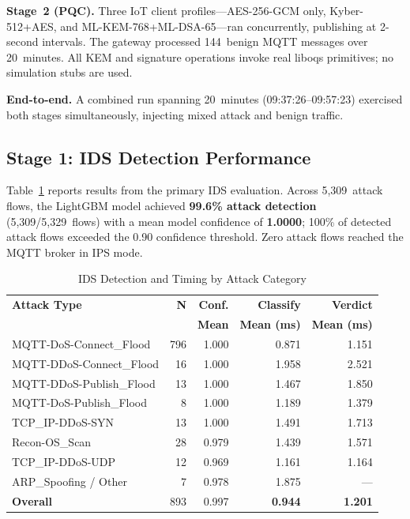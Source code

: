 \documentclass[conference]{IEEEtran}
\begin{document}
\textbf{Stage~2 (PQC).} Three IoT client profiles---AES-256-GCM only, Kyber-512+AES, and ML-KEM-768+ML-DSA-65---ran concurrently, publishing at 2-second intervals. The gateway processed 144~benign MQTT messages over 20~minutes. All KEM and signature operations invoke real liboqs primitives; no simulation stubs are used.

\textbf{End-to-end.} A combined run spanning 20~minutes (09:37:26--09:57:23) exercised both stages simultaneously, injecting mixed attack and benign traffic.

\subsection{Stage 1: IDS Detection Performance}

Table~\ref{tab:ids} reports results from the primary IDS evaluation. Across 5,309~attack flows, the LightGBM model achieved \textbf{99.6\% attack detection} (5,309/5,329~flows) with a mean model confidence of \textbf{1.0000}; 100\% of detected attack flows exceeded the 0.90 confidence threshold. Zero attack flows reached the MQTT broker in IPS mode.

\begin{table}[!t]
\centering
\captionsetup{font=footnotesize, skip=2pt}
\caption{IDS Detection and Timing by Attack Category}
\label{tab:ids}
\footnotesize
\setlength{\tabcolsep}{3pt}
\begin{tabular}{lrrrr}
\toprule
\textbf{Attack Type} & \textbf{N} & \textbf{Conf.} & \textbf{Classify} & \textbf{Verdict} \\
                     &            & \textbf{Mean}  & \textbf{Mean (ms)}& \textbf{Mean (ms)} \\
\midrule
MQTT-DoS-Connect\_Flood  & 796 & 1.000 & 0.871 & 1.151 \\
MQTT-DDoS-Connect\_Flood & 16  & 1.000 & 1.958 & 2.521 \\
MQTT-DDoS-Publish\_Flood & 13  & 1.000 & 1.467 & 1.850 \\
MQTT-DoS-Publish\_Flood  & 8   & 1.000 & 1.189 & 1.379 \\
TCP\_IP-DDoS-SYN         & 13  & 1.000 & 1.491 & 1.713 \\
Recon-OS\_Scan           & 28  & 0.979 & 1.439 & 1.571 \\
TCP\_IP-DDoS-UDP         & 12  & 0.969 & 1.161 & 1.164 \\
ARP\_Spoofing / Other    & 7   & 0.978 & 1.875 & —      \\
\midrule
\textbf{Overall}         & 893 & 0.997 & \textbf{0.944} & \textbf{1.201} \\
\bottomrule
\end{tabular}
\vspace{-2mm}
\end{table}
\end{document}
